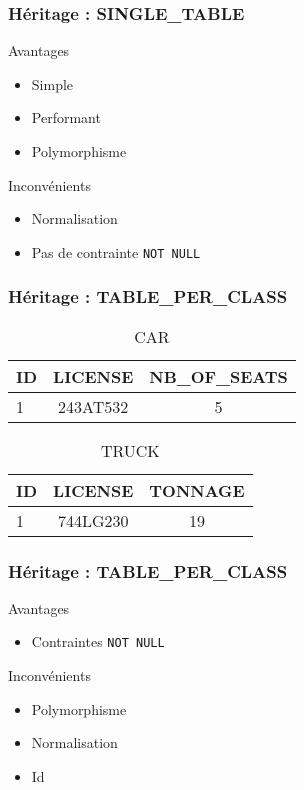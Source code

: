 \documentclass[t,12pt]{beamer}
\begin{document}
\begin{frame}
	\frametitle{H\'eritage : SINGLE\_TABLE}

	\begin{exampleblock}{Avantages}
		\begin{itemize}
			\item Simple
			\item Performant
			\item Polymorphisme
		\end{itemize}
	\end{exampleblock}

	\begin{alertblock}{Inconv\'enients}
		\begin{itemize}
			\item Normalisation
			\item Pas de contrainte \lstinline{NOT NULL}
		\end{itemize}
	\end{alertblock}
\end{frame}

\begin{frame}
	\frametitle{H\'eritage : TABLE\_PER\_CLASS}

	\begin{table}
		\caption{CAR}
		\begin{tabular}{l | c | c}
			ID & LICENSE & NB\_OF\_SEATS \\
			\hline
			1 & 243AT532 & 5
		\end{tabular}
	\end{table}
	
	\begin{table}
		\caption{TRUCK}
		\begin{tabular}{l | c | c}
			ID & LICENSE & TONNAGE \\
			\hline
			1 & 744LG230 & 19
		\end{tabular}
	\end{table}
\end{frame}

\begin{frame}
	\frametitle{H\'eritage : TABLE\_PER\_CLASS}

	\begin{exampleblock}{Avantages}
		\begin{itemize}
			\item Contraintes \lstinline{NOT NULL}
		\end{itemize}
	\end{exampleblock}

	\begin{alertblock}{Inconv\'enients}
		\begin{itemize}
			\item Polymorphisme
			\item Normalisation
			\item Id
		\end{itemize}
	\end{alertblock}
\end{frame}
\end{document}
